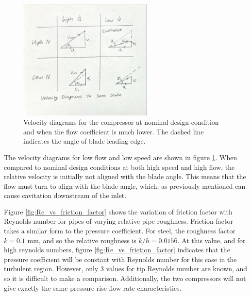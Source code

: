 \documentclass{article}
\begin{document}
\begin{figure}[H]
    \centering
    \includegraphics[width=0.6\textwidth]{flow_scenario_velocity_diagrams.jpg}
    \caption{Velocity diagrams for the compressor at nominal design condition and when the flow coefficient is much lower. The dashed line indicates the angle of blade leading edge.}
    \label{fig:flow_scenario_velocity_diagrams}
\end{figure}

The velocity diagrams for low flow and low speed are shown in figure \ref{fig:flow_scenario_velocity_diagrams}.
When compared to nominal design conditions at both high speed and high flow, the relative velocity is initially not aligned with the blade angle.
This means that the flow must turn to align with the blade angle, which, as previously mentioned can cause cavitation downstream of the inlet.



Figure \ref{fig:Re_vs_friction_factor} shows the variation of friction factor with Reynolds number for pipes of varying relative pipe roughness.
Friction factor takes a similar form to the pressure coefficient.
For steel, the roughness factor $k = 0.1$ mm, and so the relative roughness is $k/h = 0.0156$.
At this value, and for high reynolds numbers, figure \ref{fig:Re_vs_friction_factor} indicates that the
pressure coefficient will be constant with Reynolds number for this case in the turbulent region.
However, only 3 values for tip Reynolds number are known, and so it is difficult to make a comparison.
Additionally, the two compressors will not give exactly the same pressure rise-flow rate characteristics.
\end{document}

